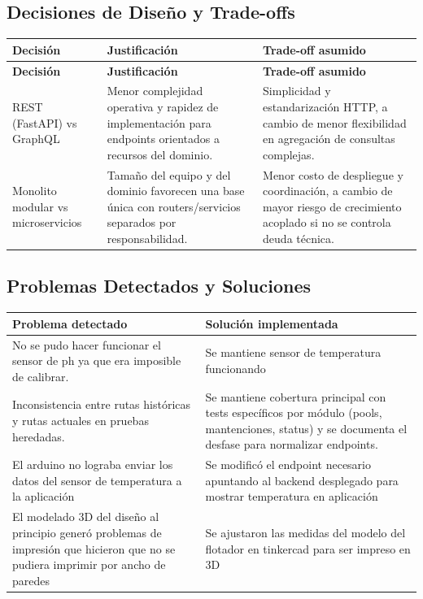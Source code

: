 \documentclass[11pt, a4paper]{article}
\begin{document}
\subsection{Decisiones de Diseño y Trade-offs}

\begin{longtable}{@{} p{3.8cm} p{5.8cm} p{5.8cm} @{}}
  \toprule
  \textbf{Decisión} & \textbf{Justificación} & \textbf{Trade-off asumido} \\
  \midrule
  \endfirsthead
  \toprule
  \textbf{Decisión} & \textbf{Justificación} & \textbf{Trade-off asumido} \\
  \midrule
  \endhead
  REST (FastAPI) vs GraphQL & Menor complejidad operativa y rapidez de implementación para endpoints orientados a recursos del dominio. & Simplicidad y estandarización HTTP, a cambio de menor flexibilidad en agregación de consultas complejas. \\
  Monolito modular vs microservicios & Tamaño del equipo y del dominio favorecen una base única con routers/servicios separados por responsabilidad. & Menor costo de despliegue y coordinación, a cambio de mayor riesgo de crecimiento acoplado si no se controla deuda técnica. \\
  \bottomrule
\end{longtable}

\subsection{Problemas Detectados y Soluciones}

\begin{tabularx}{\textwidth}{@{} p{4cm} X @{}}
  \toprule
  \textbf{Problema detectado} & \textbf{Solución implementada} \\
  \midrule
  No se pudo hacer funcionar el sensor de ph ya que era imposible de calibrar. & Se mantiene sensor de temperatura funcionando\\
  Inconsistencia entre rutas históricas y rutas actuales en pruebas heredadas. & Se mantiene cobertura principal con tests específicos por módulo (pools, mantenciones, status) y se documenta el desfase para normalizar endpoints. \\
  El arduino no lograba enviar los datos del sensor de temperatura a la aplicación & Se modificó el endpoint necesario apuntando al backend desplegado para mostrar temperatura en aplicación\\
  El modelado 3D del diseño al principio generó problemas de impresión que hicieron que no se pudiera imprimir por ancho de paredes & Se ajustaron las medidas del modelo del flotador en tinkercad para ser impreso en 3D\\
  \bottomrule
\end{tabularx}
\end{document}
